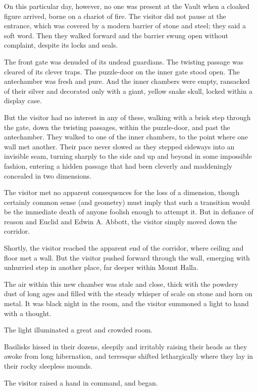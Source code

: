 On this particular day, however, no one was present at the Vault when a
cloaked figure arrived, borne on a chariot of fire. The visitor did not
pause at the entrance, which was covered by a modern barrier of stone
and steel; they said a soft word. Then they walked forward and the
barrier swung open without complaint, despite its locks and seals.

The front gate was denuded of its undead guardians. The twisting passage
was cleared of its clever traps. The puzzle-door on the inner gate stood
open. The antechamber was fresh and pure. And the inner chambers were
empty, ransacked of their silver and decorated only with a giant, yellow
snake skull, locked within a display case.

But the visitor had no interest in any of these, walking with a brisk
step through the gate, down the twisting passages, within the
puzzle-door, and past the antechamber. They walked to one of the inner
chambers, to the point where one wall met another. Their pace never
slowed as they stepped sideways into an invisible seam, turning sharply
to the side and up and beyond in some impossible fashion, entering a
hidden passage that had been cleverly and maddeningly concealed in two
dimensions.

The visitor met no apparent consequences for the loss of a dimension,
though certainly common sense (and geometry) must imply that such a
transition would be the immediate death of anyone foolish enough to
attempt it. But in defiance of reason and Euclid and Edwin A. Abbott,
the visitor simply moved down the corridor.

Shortly, the visitor reached the apparent end of the corridor, where
ceiling and floor met a wall. But the visitor pushed forward through the
wall, emerging with unhurried step in another place, far deeper within
Mount Halla.

The air within this new chamber was stale and close, thick with the
powdery dust of long ages and filled with the steady whisper of scale on
stone and horn on metal. It was black night in the room, and the visitor
summoned a light to hand with a thought.

The light illuminated a great and crowded room.

Basilisks hissed in their dozens, sleepily and irritably raising their
heads as they awoke from long hibernation, and terresque shifted
lethargically where they lay in their rocky sleepless mounds.

The visitor raised a hand in command, and began.

